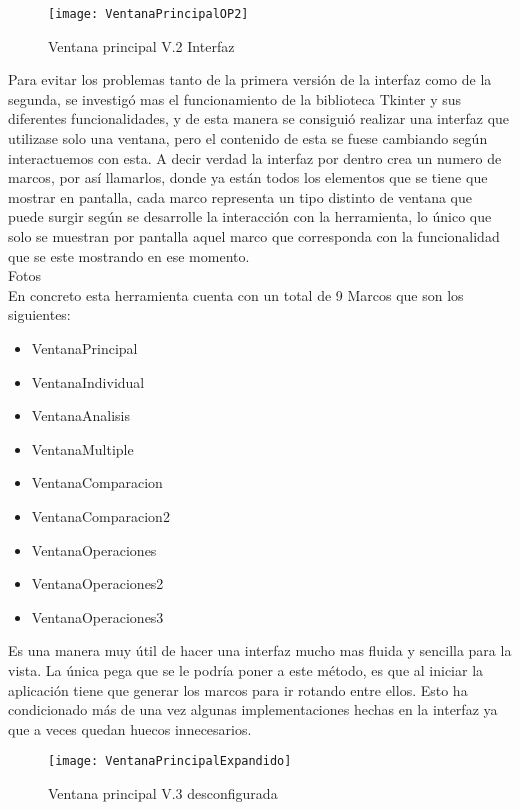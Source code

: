 \begin{figure}[H]
\centering
\texttt{[image: VentanaPrincipalOP2]}
\caption{Ventana principal V.2 Interfaz}
\end{figure}


Para evitar los problemas tanto de la primera versión de la interfaz como de la segunda, se investigó mas el funcionamiento de la biblioteca Tkinter y sus diferentes funcionalidades, y de esta manera se consiguió realizar una interfaz que utilizase solo una ventana\cite{VideoTkinter2}, pero el contenido  de esta se  fuese cambiando según interactuemos con esta. A decir verdad la interfaz por dentro crea un numero de  marcos, por así llamarlos, donde ya están todos los elementos que se tiene que mostrar en pantalla, cada marco representa un tipo distinto de ventana que puede surgir según se desarrolle la interacción con la herramienta, lo único que solo se muestran por pantalla aquel marco que corresponda con la funcionalidad que se este mostrando en ese momento.\\

Fotos\\

En concreto esta herramienta cuenta con un total de 9 Marcos que son los siguientes:\\

\begin{itemize}
	\item VentanaPrincipal
	\item VentanaIndividual
	\item VentanaAnalisis
	\item VentanaMultiple
	\item VentanaComparacion
	\item VentanaComparacion2
	\item VentanaOperaciones
	\item VentanaOperaciones2
	\item VentanaOperaciones3
\end{itemize}



Es una manera muy útil de hacer una interfaz mucho mas fluida y sencilla para la vista. La única pega que se le podría poner a este método, es que al iniciar la aplicación tiene que generar los marcos para ir rotando entre ellos. Esto ha condicionado más de una vez algunas implementaciones hechas en la interfaz ya que a veces quedan huecos innecesarios.\\

\begin{figure}[H]
\centering
\texttt{[image: VentanaPrincipalExpandido]}
\caption{Ventana principal V.3 desconfigurada}
\end{figure}


